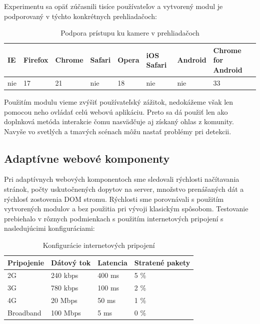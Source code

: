 Experimentu sa opäť zúčasnili tisíce používateľov a vytvorený modul je podporovaný v týchto konkrétnych prehliadačoch:

\begin{table}[H]
  \begin{tabular}{ | l | l | l | l | l | l | l | l |}
    \hline
    IE & Firefox & Chrome & Safari & Opera & iOS Safari & Android & Chrome for Android \\ \hline
    nie & 17 & 21 & nie & 18 & nie & nie & 33  \\
    \hline
  \end{tabular}
  \caption[Podpora prístupu ku kamere v prehliadačoch]{Podpora prístupu ku kamere v prehliadačoch}
\end{table}

Použitím modulu vieme zvýšiť používateľský zážitok, nedokážeme však len pomocou neho ovládať celú webovú aplikáciu. Preto sa dá použiť len ako doplnková metóda interakcie čomu nasvädčuje aj získaný ohlas z komunity. Navyše vo svetlých a tmavých scénach môžu nastať problémy pri detekcii.




\newpage
\subsection{Adaptívne webové komponenty} %
\label{sub:webov_komponenty}

Pri adaptívnych webových komponentoch sme sledovali rýchlosti načítavania stránok, počty uskutočnených dopytov na server, množstvo prenášaných dát a rýchlosť zostovenia DOM stromu. Rýchlosti sme porovnávali s použitím vytvorených modulov a bez použitia pri vývoji klasickým spôsobom. Testovanie prebiehalo v rôznych podmienkach s použitím internetových pripojení s nasledujúcimi konfiguráciami:

\begin{table}[H]
  \begin{tabular}{ | l | l | l | l |}
    \hline
    Pripojenie & Dátový tok & Latencia & Stratené pakety \\ \hline
    2G & 240 kbps & 400 ms & 5 \%  \\  \hline
    3G & 780 kbps & 100 ms & 2 \%  \\ \hline
    4G & 20 Mbps & 50 ms & 1 \%  \\ \hline
    Broadband & 100 Mbps & 5 ms & 0 \%  \\
    \hline
  \end{tabular}
  \caption[Konfigurácie internetových pripojení]{Konfigurácie internetových pripojení}
\end{table}

